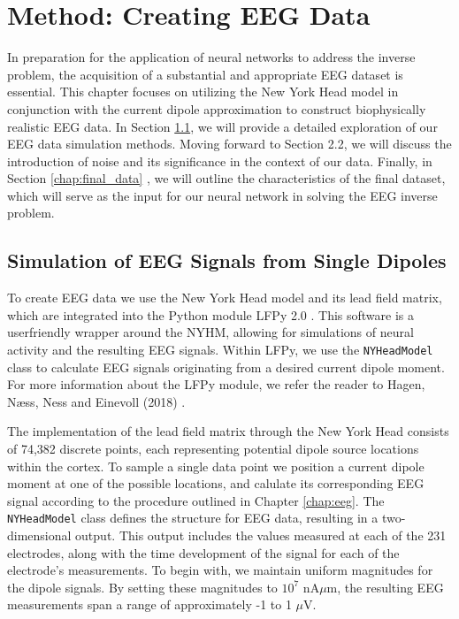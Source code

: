 \documentclass[a4paper, UKenglish, 11pt]{uiomaster}
\begin{document}
\chapter{Method: Creating EEG Data}
In preparation for the application of neural networks to address the inverse problem, the acquisition of a substantial and appropriate EEG dataset is essential. This chapter focuses on utilizing the New York Head model in conjunction with the current dipole approximation to construct biophysically realistic EEG data.
In Section \ref{chap:simulation}, we will provide a detailed exploration of our EEG data simulation methods. Moving forward to Section 2.2, we will discuss the introduction of noise and its significance in the context of our data. Finally, in Section \ref{chap:final_data} , we will outline the characteristics of the final dataset, which will serve as the input for our neural network in solving the EEG inverse problem.


\section{Simulation of EEG Signals from Single Dipoles} \label{chap:simulation}
To create EEG data we use the New York Head model and its lead field matrix, which are integrated into the Python module LFPy 2.0 \cite{LFPy}. This software is a userfriendly wrapper around the NYHM, allowing for simulations of neural activity and the resulting EEG signals. Within LFPy, we use the \texttt{NYHeadModel} class to calculate EEG signals originating from a desired current dipole moment. For more information about the LFPy module, we refer the reader to Hagen, Næss, Ness and Einevoll (2018) \cite{LFPy}.

The implementation of the lead field matrix through the New York Head consists of 74,382 discrete points, each representing potential dipole source locations within the cortex. To sample a single data point we position a current dipole moment at one of the possible locations, and calulate its corresponding EEG signal according to the procedure outlined in Chapter \ref{chap:eeg}. The \texttt{NYHeadModel} class defines the structure for EEG data, resulting in a two-dimensional output. This output includes the values measured at each of the 231 electrodes, along with the time development of the signal for each of the electrode's measurements. To begin with, we maintain uniform magnitudes for the dipole signals. By setting these magnitudes to $10^7$ nA$\mu$m, the resulting EEG measurements span a range of approximately -1 to 1 $\mu$V.
\end{document}
